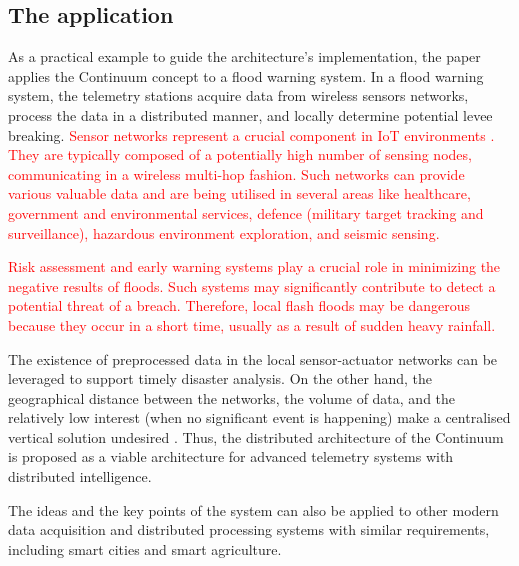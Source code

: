 \subsection{The application}

As a practical example to guide the architecture's implementation, the paper applies the Continuum concept to a flood warning system. In a flood warning system, the telemetry stations acquire data from wireless sensors networks, process the data in a distributed manner, and locally determine potential levee breaking. \textcolor{red}{Sensor networks represent a crucial component in IoT environments \cite{yu2017survey}. They are typically composed of a potentially high number of sensing nodes, communicating in a wireless multi-hop fashion. Such networks can provide various valuable data and are being utilised in several areas like healthcare, government and environmental services, defence (military target tracking and surveillance), hazardous environment exploration, and seismic sensing.}

\textcolor{red}{Risk assessment and early warning systems play a crucial role in minimizing the negative results of floods. Such systems may significantly contribute to detect a potential threat of a breach. Therefore, local flash floods may be dangerous because they occur in a short time, usually as a result of sudden heavy rainfall.}

The existence of preprocessed data in the local sensor-actuator networks can be leveraged to support timely disaster analysis. On the other hand, the geographical distance between the networks, the volume of data, and the relatively low interest (when no significant event is happening) make a centralised vertical solution undesired \cite{balouek2019towards}. Thus, the distributed architecture of the Continuum is proposed as a viable architecture for advanced telemetry systems with distributed intelligence.

The ideas and the key points of the system can also be applied to other modern data acquisition and distributed processing systems with similar requirements, including smart cities and smart agriculture.

